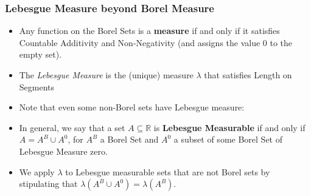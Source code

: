 \begin{frame}
\frametitle{Lebesgue Measure beyond Borel Measure}

\begin{itemize}[<+->]

\item Any function on the Borel Sets is a \textbf{measure} if and only if it satisfies Countable Additivity and Non-Negativity (and assigns the value 0 to the empty set).\label{gloss:measure} 

\item The \emph{Lebesgue Measure} is the (unique) measure $\lambda$ that satisfies Length on Segments

\item Note that even some non-Borel sets have Lebesgue measure: 

\bi

\item In general, we say that a set  $A \subseteq \mathbb{R}$ is \textbf{Lebesgue Measurable} if and only if $A = A^B \cup A^0$, for $A^B$  a Borel Set and $A^0$ a subset of some Borel Set of Lebesgue Measure zero.

\item We apply $\lambda$ to Lebesgue measurable sets that are not Borel sets by stipulating that  $\lambda(A^B \cup A^0) = \lambda(A^B)$. 
\ei







\end{itemize}
\end{frame}
